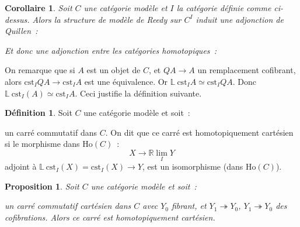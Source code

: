 \documentclass{amsart}
\theoremstyle{plain}
\newtheorem{prop}[theo]{Proposition}
\newtheorem{coro}[theo]{Corollaire}
\theoremstyle{definition}
\newtheorem{defi}[theo]{Définition}
\theoremstyle{remark}
\newcommand{\Ho}[1]{\mathrm{Ho}({#1})}
\newcommand{\ra}{\rightarrow}
\begin{document}
\begin{coro}
  Soit $C$ une catégorie modèle et $I$ la catégorie définie comme ci-dessus. Alors la structure de modèle de Reedy sur $C^I$ induit une adjonction
  de Quillen~:
  \begin{center}
  \end{center}
  Et donc une adjonction entre les catégories homotopiques~:
  \begin{center}
  \end{center}
\end{coro}

On remarque que si $A$ est un objet de $C$, et $QA\ra A$ un remplacement cofibrant,
alors $\mathrm{cst}_IQA\ra\mathrm{cst}_I A$ est une équivalence. Or $\mathbb{L}\:\mathrm{cst}_I A\simeq\mathrm{cst}_IQA$.
Donc $\mathbb{L}\:\mathrm{cst}_I(A)\simeq \mathrm{cst}_IA$.
Ceci justifie la définition suivante.

\begin{defi}
  Soit $C$ une catégorie modèle et soit~:
  \begin{center}
  \end{center}
  un carré commutatif dans $C$.
  On dit que ce carré est homotopiquement cartésien si le morphisme dans $\Ho{C}$~:
  $$X\ra \mathbb{R}\lim_I Y$$
  adjoint à $\mathbb{L}\:\mathrm{cst}_I(X)=\mathrm{cst}_I(X)\ra Y$, est un isomorphisme (dans $\Ho{C}$).
\end{defi}

\begin{prop}\label{carrecartesienbasique}
  Soit $C$ une catégorie modèle et soit~:
  \begin{center}
  \end{center}
  un carré commutatif cartésien dans $C$ avec $Y_0$ fibrant, et $Y_1\twoheadrightarrow Y_0$, $Y_1\twoheadrightarrow Y_0$ des cofibrations.
  Alors ce carré est homotopiquement cartésien.
\end{prop}
\end{document}
